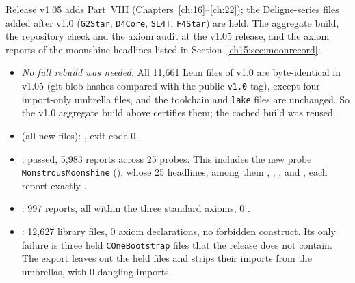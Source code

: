 \begin{status}[title={The release build of v1.05}]
Release v1.05 adds Part~VIII (Chapters~\ref{ch:16}--\ref{ch:22}); the Deligne-series files added after v1.0
(\texttt{G2Star}, \texttt{D4Core}, \texttt{SL4T}, \texttt{F4Star}) are held.
The aggregate build, the repository check and the axiom audit at the v1.05 release, and the axiom reports of
the moonshine headlines listed in Section~\ref{ch15:sec:moonrecord}:
\begin{itemize}
\item \emph{No full rebuild was needed.} All 11{,}661 Lean files of v1.0 are byte-identical in v1.05
  (git blob hashes compared with the public \texttt{v1.0} tag), except four import-only umbrella files, and the
  toolchain and \texttt{lake} files are unchanged. So the v1.0 aggregate build above certifies them; the cached
  build was reused.
\item {} (all new files): , exit code 0.
\item {}: passed, 5{,}983 reports across 25 probes. This includes the new
  probe \texttt{MonstrousMoonshine} (), whose 25
  headlines, among them , , ,
   and , each report exactly
  .
\item {}: 997 reports, all within the three standard axioms, 0
  .
\item {}: 12{,}627 library files, 0 axiom declarations, no forbidden construct. Its
  only failure is three held \texttt{COneBootstrap} files that the release does not contain. The export leaves out the
  held files and strips their imports from the umbrellas, with 0 dangling imports.
\end{itemize}
\end{status}


